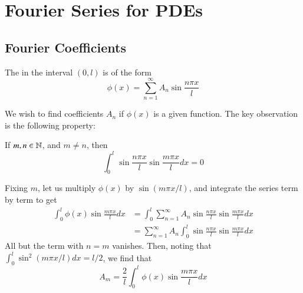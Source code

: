 %
%
%
\chapter{Fourier Series for PDEs}
\label{FourierPDE} %

\section{Fourier Coefficients}

\begin{definition}
    The  in the interval $(0,l)$ is of the form \begin{equation}
        \phi(x) = \sum_{n=1}^{\infty}A_n\sin\frac{n\pi x}{l}
    \end{equation}
\end{definition}

We wish to find coefficients $A_n$ if $\phi(x)$ is a given function. The key observation is the following property: 

\begin{proposition}
    If $m,n \in \mathbb N$, and $m \neq n$, then \begin{equation*}
        \int_0^l\sin\frac{n\pi x}{l}\sin\frac{m\pi x}{l}dx = 0
    \end{equation*}
\end{proposition}

Fixing $m$, let us multiply $\phi(x)$ by $\sin(m\pi x/l)$, and integrate the series term by term to get \begin{align*}
    \int_0^l\phi(x)\sin\frac{m\pi x}{l}dx &= \int_0^l\sum_{n=1}^{\infty}A_n\sin\frac{n\pi x}{l}\sin\frac{m\pi x}{l}dx \\
    &= \sum_{n=1}^{\infty}A_n\int_0^l\sin\frac{n\pi x}{l}\sin\frac{m\pi x}{l}dx 
\end{align*}
All but the term with $n = m$ vanishes. Then, noting that $\int_0^l\sin^2(m\pi x/l)dx = l/2$, we find that \begin{equation}
    \boxed{A_m = \frac{2}{l}\int_0^l\phi(x)\sin\frac{m\pi x}{l}dx}
\end{equation}


